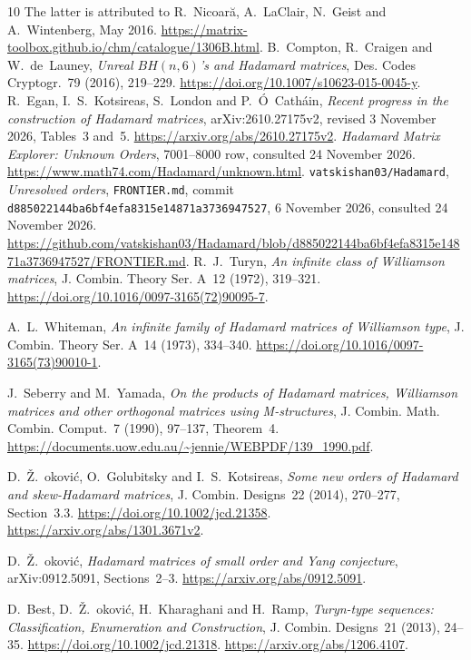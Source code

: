 \documentclass[10pt]{article}
\begin{document}
\begin{thebibliography}{10}
The latter is attributed to R.~Nicoar\u{a}, A.~LaClair, N.~Geist and
A.~Wintenberg, May 2016.
\url{https://matrix-toolbox.github.io/chm/catalogue/1306B.html}.
B.~Compton, R.~Craigen and W.~de~Launey,
\emph{Unreal $BH(n,6)$'s and Hadamard matrices},
Des. Codes Cryptogr.\ 79 (2016), 219--229.
\url{https://doi.org/10.1007/s10623-015-0045-y}.
R.~Egan, I.~S.~Kotsireas, S.~London and P.~\'{O}~Cath\'ain,
\emph{Recent progress in the construction of Hadamard matrices},
arXiv:2610.27175v2, revised 3 November 2026, Tables~3 and~5.
\url{https://arxiv.org/abs/2610.27175v2}.
\emph{Hadamard Matrix Explorer: Unknown Orders},
7001--8000 row, consulted 24 November 2026.
\url{https://www.math74.com/Hadamard/unknown.html}.
\texttt{vatskishan03/Hadamard}, \emph{Unresolved orders},
\texttt{FRONTIER.md}, commit \texttt{d885022144ba6bf4efa8315e14871a3736947527},
6 November 2026, consulted 24 November 2026.
\url{https://github.com/vatskishan03/Hadamard/blob/d885022144ba6bf4efa8315e14871a3736947527/FRONTIER.md}.
R.~J.~Turyn, \emph{An infinite class of Williamson matrices},
J. Combin. Theory Ser. A\ 12 (1972), 319--321.
\url{https://doi.org/10.1016/0097-3165(72)90095-7}.

A.~L.~Whiteman,
\emph{An infinite family of Hadamard matrices of Williamson type},
J. Combin. Theory Ser. A\ 14 (1973), 334--340.
\url{https://doi.org/10.1016/0097-3165(73)90010-1}.

J.~Seberry and M.~Yamada,
\emph{On the products of Hadamard matrices, Williamson matrices and other
orthogonal matrices using M-structures},
J. Combin. Math. Combin. Comput.\ 7 (1990), 97--137, Theorem~4.
\url{https://documents.uow.edu.au/~jennie/WEBPDF/139_1990.pdf}.

D.~\v{Z}.~\DJ{}okovi\'c, O.~Golubitsky and I.~S.~Kotsireas,
\emph{Some new orders of Hadamard and skew-Hadamard matrices},
J. Combin. Designs\ 22 (2014), 270--277, Section~3.3.
\url{https://doi.org/10.1002/jcd.21358}.
\url{https://arxiv.org/abs/1301.3671v2}.

D.~\v{Z}.~\DJ{}okovi\'c,
\emph{Hadamard matrices of small order and Yang conjecture},
arXiv:0912.5091, Sections~2--3.
\url{https://arxiv.org/abs/0912.5091}.

D.~Best, D.~\v{Z}.~\DJ{}okovi\'c, H.~Kharaghani and H.~Ramp,
\emph{Turyn-type sequences: Classification, Enumeration and Construction},
J. Combin. Designs\ 21 (2013), 24--35.
\url{https://doi.org/10.1002/jcd.21318}.
\url{https://arxiv.org/abs/1206.4107}.

\end{thebibliography}
\end{document}
